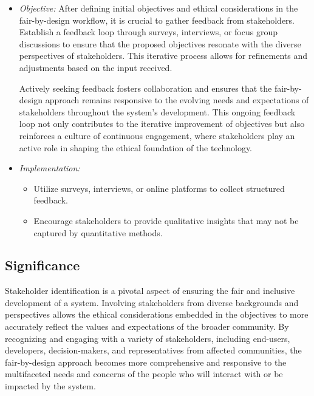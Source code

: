 \begin{itemize}

    \item \emph{Objective:} After defining initial objectives and ethical considerations in the fair-by-design workflow, it is crucial to gather feedback from stakeholders. Establish a feedback loop through surveys, interviews, or focus group discussions to ensure that the proposed objectives resonate with the diverse perspectives of stakeholders. This iterative process allows for refinements and adjustments based on the input received.

    Actively seeking feedback fosters collaboration and ensures that the fair-by-design approach remains responsive to the evolving needs and expectations of stakeholders throughout the system's development. This ongoing feedback loop not only contributes to the iterative improvement of objectives but also reinforces a culture of continuous engagement, where stakeholders play an active role in shaping the ethical foundation of the technology.

    \item \emph{Implementation:}

    \begin{itemize}

        \item Utilize surveys, interviews, or online platforms to collect structured feedback.

        \item Encourage stakeholders to provide qualitative insights that may not be captured by quantitative methods.

    \end{itemize}

\end{itemize}

\subsection{Significance}

Stakeholder identification is a pivotal aspect of ensuring the fair and inclusive development of a system. Involving stakeholders from diverse backgrounds and perspectives allows the ethical considerations embedded in the objectives to more accurately reflect the values and expectations of the broader community. By recognizing and engaging with a variety of stakeholders, including end-users, developers, decision-makers, and representatives from affected communities, the fair-by-design approach becomes more comprehensive and responsive to the multifaceted needs and concerns of the people who will interact with or be impacted by the system.

